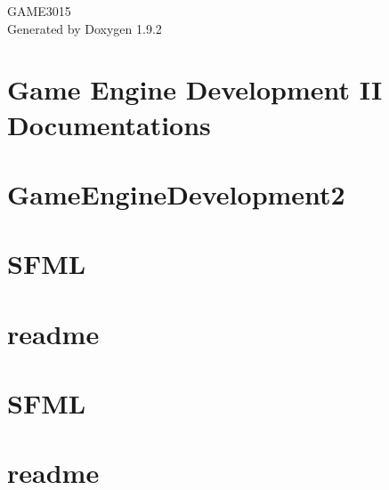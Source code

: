 \documentclass[twoside]{book}
\newcommand{\+}{\discretionary{\mbox{\scriptsize$\hookleftarrow$}}{}{}}
\newcommand{\clearemptydoublepage}{%
    \newpage{\pagestyle{empty}\cleardoublepage}%
  }
\begin{document}
  \raggedbottom
    \hypersetup{pageanchor=false,
                bookmarksnumbered=true,
                pdfencoding=unicode
               }
  \begin{titlepage}
  \vspace*{7cm}
  \begin{center}%
  {\Large GAME3015}\\
  \vspace*{1cm}
  {\large Generated by Doxygen 1.9.2}\\
  \end{center}
  \end{titlepage}
  \clearemptydoublepage
  \tableofcontents
  \clearemptydoublepage
  \hypersetup{pageanchor=true}
\chapter{Game Engine Development II Documentations}
\label{index}\hypertarget{index}{}
\chapter{Game\+Engine\+Development2}
\label{md__r_e_a_d_m_e}

\chapter{SFML}
\label{md__s_f_m_l_2_5_1_license}

\chapter{readme}
\label{md__s_f_m_l_2_5_1_readme}

\chapter{SFML}
\label{md__week14__s_f_m_l_2_5_1_license}

\chapter{readme}
\label{md__week14__s_f_m_l_2_5_1_readme}

\end{document}
